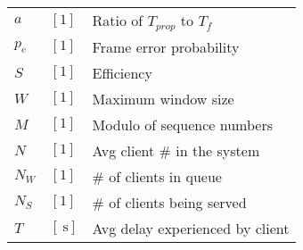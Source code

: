 \documentclass{form}
\begin{document}
\begin{center}
\begin{minipage}{0.44\textwidth}
\begin{tabular}{@{}l l | l@{}}
            $a$        & $[1                    ]$ & Ratio of $T_{prop}$ to $T_f$                                             \\
            $p_e$      & $[1                    ]$ & Frame error probability                                                  \\
            $S$        & $[1                    ]$ & Efficiency                                                               \\
            $W$        & $[1                    ]$ & Maximum window size                                                      \\
            $M$        & $[1                    ]$ & Modulo of sequence numbers                                               \\
            $N$        & $[1                    ]$ & Avg client \# in the system                                              \\
            $N_W$      & $[1                    ]$ & \# of clients in queue                                                   \\
            $N_S$      & $[1                    ]$ & \# of clients being served                                               \\
            $T$        & $[\SI{}{\second}       ]$ & Avg delay experienced by client                                          \\
        \end{tabular}
    \end{minipage}
\end{center}
\end{document}
